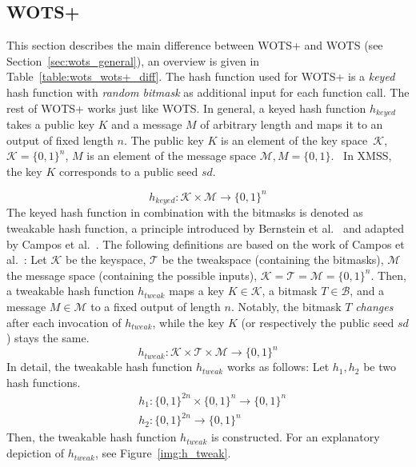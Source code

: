 \subsection{WOTS+}
\label{sec:wots+_general}
This section describes the main difference between WOTS+ and WOTS (see Section~\ref{sec:wots_general}), an overview is given in Table~\ref{table:wots_wots+_diff}. The hash function used for WOTS+ is a \textit{keyed} hash function with \textit{random bitmask} as additional input for each function call. The rest of WOTS+ works just like WOTS.
In general, a keyed hash function $h_{keyed}$ takes a public key $K$ and a message $M$ of arbitrary length and maps it to an output of fixed length $n$. The public key $K$ is an element of the key space~$\mathcal{K}$, $\mathcal{K}=\{0,1\}^n$, $M$ is an element of the message space $\mathcal{M}, M=\{0,1\}$.~\cite{keyed_hashfct_introduct_2006} In XMSS, the key $K$ corresponds to a public seed $sd$. 

\begin{equation}
\label{eq:keyed_hashfc_general}
h_{keyed}: \mathcal{K} \times \mathcal{M} \rightarrow \{0, 1 \}^n 
\end{equation}
The keyed hash function in combination with the bitmasks is denoted as tweakable hash function, a principle introduced by Bernstein et al.~\cite{tweakable_basispaper_sphincs_2019} and adapted by Campos et al.~\cite{fabio_paper_lms_vs_xmss}. The following definitions are based on the work of Campos et al.~\cite{fabio_paper_lms_vs_xmss}: 
Let $\mathcal{K}$ be the keyspace, $\mathcal{T}$ be the tweakspace (containing the bitmasks), $\mathcal{M}$ the message space (containing the possible inputs), $\mathcal{K}= \mathcal{T}=\mathcal{M}=\{0,1\}^n$.
Then, a tweakable hash function $h_{tweak}$ maps a key $K \in \mathcal{K}$, a bitmask $T \in \mathcal{B}$, and a message $M \in \mathcal{M}$ to a fixed output of length $n$. Notably, the bitmask $T$ \textit{changes} after each invocation of $h_{tweak}$, while the key $K$ (or respectively the public seed $sd$) stays the same.
\begin{equation}
h_{tweak}: \mathcal{K} \times \mathcal{T} \times \mathcal{M} \rightarrow \{0,1\}^n
\end{equation}
In detail, the tweakable hash function $h_{tweak}$ works as follows: Let $h_1, h_2$ be two hash functions. %
\begin{align}
& h_1 : \{0,1\}^{2n} \times \{0,1\}^n \rightarrow \{0,1\}^n \\
& h_2 : \{0,1\}^{2n} \rightarrow \{0,1\}^n 
\end{align}
Then, the tweakable hash function $h_{tweak}$ is constructed. For an explanatory depiction of $h_{tweak}$, see Figure~\ref{img:h_tweak}.


